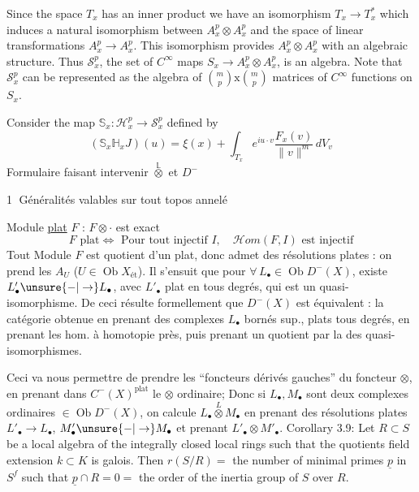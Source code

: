 Since the space $T_x$ has an inner product we have an isomorphism $T_x\longrightarrow T_x^*$ which induces a natural isomorphism between $A_x^p\otimes A_x^p$ and the space of linear transformations $A_x^p\longrightarrow A_x^p$. This isomorphism provides $A_x^p\otimes A_x^p$ with an algebraic structure. Thus $\mathcal S_x^p$, the set of $C^\infty$ maps $S_x\longrightarrow A_x^p\otimes A_x^p$, is an algebra. Note that $\mathcal S_x^p$ can be represented as the algebra of $\binom{m}{p}\mathbin{\mathrm x}\binom{m}{p}$ matrices of $C^\infty$ functions on $S_x$.

Consider the map $\mathbb S_x:\mathcal H_x^p\longrightarrow\mathcal S_x^p$ defined by
\[
\tag{4.6.7}
(\mathbb S_x\mathbb H_xJ)(u)=\xi(x)+\int_{T_x}e^{iu\cdot v}\frac{F_x(v)}{\lVert v\rVert^m}\,dV_v
\]
Formulaire faisant intervenir $\overset{\mathbb L}{\otimes}$ et $D^-$

\textcircled{1} Généralités valables sur tout topos annelé

Module \uline{plat} $F$ : $F\otimes\cdot$ est exact
\[
F\text{ plat}\Longleftrightarrow\text{ Pour tout injectif }I,\quad\mathcal Hom(F,I)\text{ est injectif}
\]
Tout Module $F$  est quotient d'un plat, donc admet des résolutions plates : on prend les $A_U$ ($U\in\operatorname{Ob}X_{\mathrm{ét}}$). Il s'ensuit  que pour $\forall\,L_\bullet\in\operatorname{Ob}D^-(X)$, existe  $L'_\bullet\unsure{-|\to}L_\bullet$, avec $L'_\bullet$ plat en tous degrés, qui est un quasi-isomorphisme.
De ceci résulte formellement que $D^-(X)$ est équivalent : la catégorie obtenue en prenant  des complexes $L_\bullet$ bornés sup., plats  tous degrés,  en prenant les hom. à homotopie près, puis prenant un quotient par la   des quasi-isomorphismes.

Ceci va nous permettre de prendre les ``foncteurs dérivés gauches'' du foncteur $\otimes$, en prenant dans $C^-(X)^{\mathrm{plat}}$ le $\otimes$ ordinaire; 
Donc si $L_\bullet,M_\bullet$ sont deux complexes ordinaires $\in\operatorname{Ob}D^-(X)$, on  calcule $L_\bullet\overset{L}{\otimes}M_\bullet$ en prenant des résolutions plates $L'_\bullet\to L_\bullet$, $M'_\bullet\unsure{-|\to}M_\bullet$ et prenant $L'_\bullet\otimes M'_\bullet$.
Corollary 3.9: Let $R\subset S$ be a local algebra of the integrally closed local rings such that the quotients field extension $k\subset K$ is galois. Then $r(S/R)=$ the number of minimal primes $\underline p$ in $S^f$ such that $\underline p\cap R=0=$ the order of the inertia group of $S$ over $R$.

